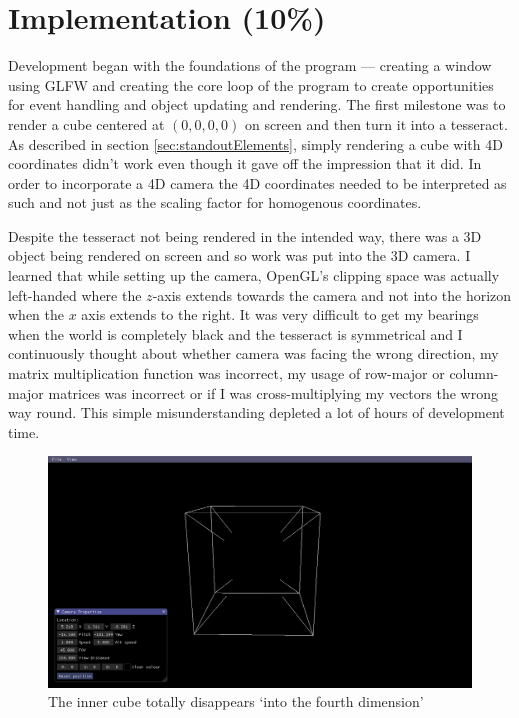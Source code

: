 \documentclass[11pt, a4paper]{article}
\begin{document}
\section{Implementation (10\%)}

Development began with the foundations of the program --- creating a window using GLFW and creating the core loop of the program to create opportunities for event handling and object updating and rendering. The first milestone was to render a cube centered at $(0, 0, 0, 0)$ on screen and then turn it into a tesseract. As described in section \ref{sec:standoutElements}, simply rendering a cube with 4D coordinates didn't work even though it gave off the impression that it did. In order to incorporate a 4D camera the 4D coordinates needed to be interpreted as such and not just as the scaling factor for homogenous coordinates.

Despite the tesseract not being rendered in the intended way, there was a 3D object being rendered on screen and so work was put into the 3D camera. I learned that while setting up the camera, OpenGL's clipping space was actually left-handed where the $z$-axis extends towards the camera and not into the horizon when the $x$ axis extends to the right. It was very difficult to get my bearings when the world is completely black and the tesseract is symmetrical and I continuously thought about whether camera was facing the wrong direction, my matrix multiplication function was incorrect, my usage of row-major or column-major matrices was incorrect or if I was cross-multiplying my vectors the wrong way round. This simple misunderstanding depleted a lot of hours of development time.

\begin{figure}[!h]
  \centering
  \includegraphics[width=\textwidth]{img/centered_4D_cube.png}
  \caption{The inner cube totally disappears `into the fourth dimension'}
  \label{fig:incorrectCamera}
\end{figure}
\end{document}
